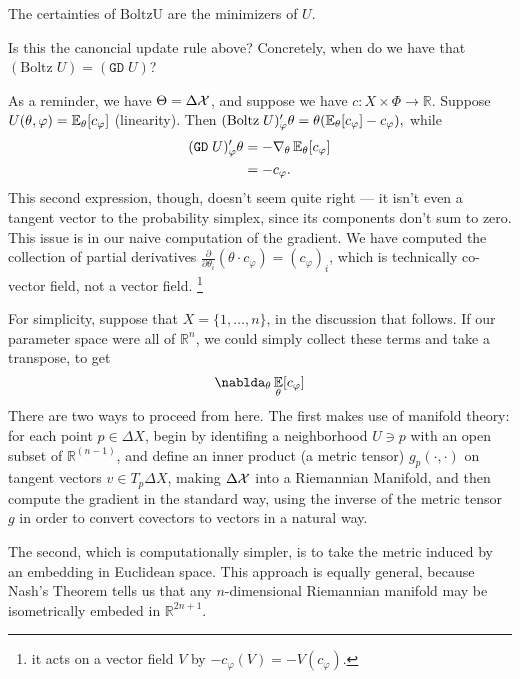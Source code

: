 \documentclass{article}
\begin{document}
The certainties of $\mathrm{Boltz U}$ are the minimizers of $U$. 


\begin{openQ}
    Is this the canoncial update rule above?
    Concretely, when do we have that
    $
        (\mathrm{Boltz}\; U) = (\mathtt{GD}\; U)
    $?
\end{openQ}
\begin{wip}
    As a reminder, we have $\Theta = \Delta \mathcal X$, and suppose we have $c : X \times \Phi \to \mathbb R$. 
    Suppose $U(\theta, \varphi) = \operatorname*{\mathbb{E}}_\theta[ c_\varphi ]$ (linearity).
    Then     
    $%
        (\mathrm{Boltz}\;U)'_\varphi \theta = \theta(\Ex_\theta[c_\varphi] - c_\varphi),
    $%
    while
    \begin{align*}
         (\mathtt{GD}\; U)'_\varphi \theta &= 
             - \nabla_{\theta} \operatorname*{\mathbb{E}}\nolimits_\theta [ c_\varphi ]
             \\ &= - c_\varphi
             .
    \end{align*}
    This second expression, though, doesn't seem quite right --- it isn't even a tangent vector to the probability simplex, since its components don't sum to zero.  
    This issue is in our naive computation of the gradient. 
    We have computed the collection of partial derivatives $\frac{\partial}{\partial \theta_i} ( \theta \cdot  c_\varphi) = (c_\varphi)_i$,
    which is technically  co-vector field, not a vector field.%
        \footnote{it acts on a vector field $V$ by $ -c_\varphi ( V ) = - V(c_\varphi)$.}
    
    For simplicity, suppose that $X = \{1, \ldots, n\}$, in the discussion that follows. 
    If our parameter space were all of $\mathbb R^n$, we could simply collect these terms and take a transpose, to get 
    \[
        \nablda_\theta \Ex_{\theta}[c_\varphi]
    \]
    There are two ways to proceed from here. 
    The first makes use of manifold theory: for each point $p \in \Delta X$, begin by identifing a neighborhood $U \ni p$ with an open subset of $\mathbb R^{(n-1)}$, and define an inner product (a metric tensor) $g_p(\cdot, \cdot)$ on tangent vectors $v \in T_p\Delta X$, making $\Delta\mathcal X$ into a Riemannian Manifold, and then compute the gradient in the standard way, using the inverse of the metric tensor $g$ in order to convert covectors to vectors in a natural way.
    
    The second, which is computationally simpler, is to take the metric induced by an embedding in Euclidean space. 
    This approach is equally general, because Nash's Theorem \cite{nash1956imbedding} tells us that any $n$-dimensional Riemannian manifold may be isometrically embeded in $\mathbb R^{2n+1}$.
    
    
    
    
\end{wip}
\end{document}
